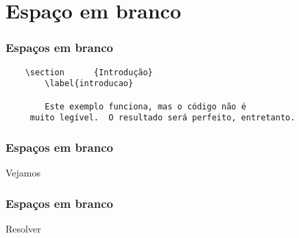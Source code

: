 \section{Espaço em branco}

\begin{frame}[fragile]
  \frametitle{Espaços em branco}
  \begin{verbatim}
    \section      {Introdução}
        \label{introducao}

        Este exemplo funciona, mas o código não é
     muito legível.  O resultado será perfeito, entretanto.
  \end{verbatim}
\end{frame}

\begin{frame}
  \frametitle{Espaços em branco}
  \huge
  Vejamos 
\end{frame}

\begin{frame}
  \frametitle{Espaços em branco}
  \huge
  Resolver 
\end{frame}
